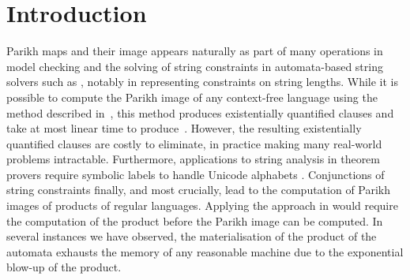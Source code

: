 \documentclass[acmsmall,review,anonymous]{acmart}\settopmatter{printfolios=true,printccs=false,printacmref=true}
\theoremstyle{definition}
\begin{document}




\maketitle


\section{Introduction}

Parikh maps and their image appears naturally as part of many operations in
model checking and the solving of string constraints in automata-based string
solvers such as \Ostrich{}, notably in representing constraints on string
lengths. While it is possible to compute the Parikh image of any context-free
language using the method described in~\cite{generate-parikh-image}, this method
produces existentially quantified clauses and take at most linear time to
produce~\cite{muscholl-linear}. However, the resulting existentially quantified
clauses are costly to eliminate, in practice making many real-world problems
intractable. Furthermore, applications to string analysis in theorem provers
require symbolic labels to handle Unicode alphabets .
Conjunctions of string constraints finally, and most crucially, lead to the
computation of Parikh images of products of regular languages. Applying the
approach in \cite{generate-parikh-image} would require the computation of the
product before the Parikh image can be computed. In several instances we have
observed, the materialisation of the product of the automata exhausts the memory
of any reasonable machine due to the exponential blow-up of the product.
\end{document}
